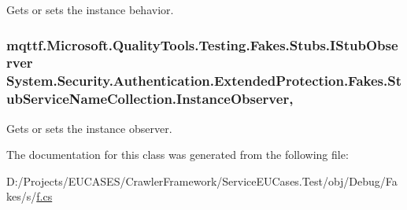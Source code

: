 Gets or sets the instance behavior.

\hypertarget{class_system_1_1_security_1_1_authentication_1_1_extended_protection_1_1_fakes_1_1_stub_service_name_collection_a267e2f773124dbbf8a021074a0860c14}{
\subsubsection[{Instance\-Observer}]{\setlength{\rightskip}{0pt plus 5cm}mqttf.\-Microsoft.\-Quality\-Tools.\-Testing.\-Fakes.\-Stubs.\-I\-Stub\-Observer System.\-Security.\-Authentication.\-Extended\-Protection.\-Fakes.\-Stub\-Service\-Name\-Collection.\-Instance\-Observer\hspace{0.3cm}{\ttfamily [get]}, {\ttfamily [set]}}}\label{class_system_1_1_security_1_1_authentication_1_1_extended_protection_1_1_fakes_1_1_stub_service_name_collection_a267e2f773124dbbf8a021074a0860c14}


Gets or sets the instance observer.



The documentation for this class was generated from the following file\-:\begin{DoxyCompactItemize}
\item 
D\-:/\-Projects/\-E\-U\-C\-A\-S\-E\-S/\-Crawler\-Framework/\-Service\-E\-U\-Cases.\-Test/obj/\-Debug/\-Fakes/s/\hyperlink{s_2f_8cs}{f.\-cs}\end{DoxyCompactItemize}
